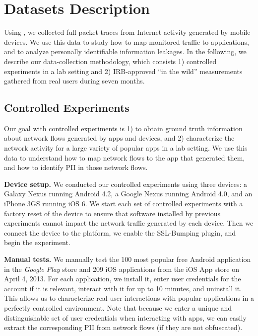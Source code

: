 \section{Datasets Description}
\label{sec:dataset}
Using \platname, we collected full packet traces from Internet activity generated by
mobile devices. We use this data to study how to map monitored traffic to applications, and to
analyze personally identifiable information leakages. In the
following, we describe our data-collection methodology, which consists 
1) controlled experiments in a lab setting and 2) IRB-approved ``in the wild'' measurements 
gathered from real users during seven months.

\subsection{Controlled Experiments}
\label{sec:dataset-contr-exper}
Our goal with controlled experiments is 1) to obtain ground truth information 
about network flows generated by apps and devices, and 2) characterize the 
network activity for a large variety of popular apps in a lab setting. We use 
this data to understand how to map network flows to the app that generated 
them, and how to identify PII in those network flows. 

\noindent\textbf{Device setup.} We conducted our controlled experiments using three devices: a Galaxy
Nexus running Android 4.2, a Google Nexus running Android 4.0, and
an iPhone 3GS running iOS 6. We start each set of controlled experiments
 with a factory reset of the device to ensure that software installed by previous 
 experiments cannot impact the network traffic generated by each device. 
 Then we connect the device to the
\platname{} platform, we enable the SSL-Bumping plugin, and begin
the experiment. 

\noindent\textbf{Manual tests.} We manually test the
100 most popular free Android application in the \emph{Google Play} store and 209
iOS applications from the iOS App store on April 4, 2013. For each
application, we install it, enter user credentials for the account if
it is relevant, interact with it for up to 10 minutes, and uninstall
it. This allows us to characterize real user interactions with popular applications 
in a perfectly controlled environment. Note that 
because we enter a unique and distinguishable set of user credentials when 
interacting with apps, we can easily extract the corresponding PII from 
network flows (if they are not obfuscated).

